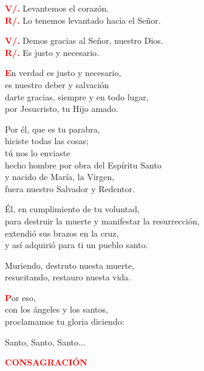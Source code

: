 \documentclass[12pt, letterpaper]{report}
\begin{document}
  \Large \hspace{-0.9cm} {\bfseries \textcolor{red}{V/.}} \hspace{0.5cm} Levantemos el coraz\'on. \\
  \Large \hspace{-0.9cm} {\bfseries \textcolor{red}{R/.}} \hspace{0.5cm} Lo tenemos levantado hacia el Se\~nor.

  \Large \hspace{-0.9cm} {\bfseries \textcolor{red}{V/.}} \hspace{0.5cm} Demos gracias al Se\~nor, nuestro Dios.\\
  \Large \hspace{-0.9cm} {\bfseries \textcolor{red}{R/.}} \hspace{0.5cm} Es justo y necesario.

  \lettrine[lines=2]{\bfseries \textcolor{red}{E}}{}\Large n verdad es justo y necesario, \\
  es nuestro deber y salvaci\'on \\
  darte gracias, siempre y en todo lugar, \\
  por Jesucristo, tu Hijo amado.

  Por \'el, que es tu parabra, \\
  hiciste todas las cosas; \\
  t\'u nos lo enviaste \\
  hecho hombre por obra del Esp\'iritu Santo \\
  y nacido de Mar\'ia, la Virgen, \\
  fuera nuestro Salvador y Redentor.

  \'El, en cumplimiento de tu voluntad, \\
  para destruir la muerte y manifestar la resurrecci\'on, \\
  extendi\'o sus brazos en la cruz, \\
  y as\'i adquiri\'o para ti un pueblo santo.

  Muriendo, destruto nuesta muerte, \\
  resucitando, restauro nuesta vida.

  \lettrine[lines=2]{\bfseries \textcolor{red}{P}}{}\Large or eso, \\
  con los \'angeles y los santos, \\
  proclamamos tu gloria diciendo:

  Santo, Santo, Santo...

  \Large {\bfseries \textcolor{red}{CONSAGRACI\'ON}}
\end{document}
